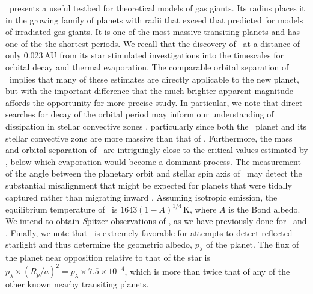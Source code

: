 \tresThree\ presents a useful testbed for theoretical models of gas giants.
Its radius places it in the growing family of planets with radii that exceed that predicted for models of irradiated gas giants.
It is one of the most massive transiting planets and has one of the the shortest periods.
We recall that the discovery of \ogletrFSb\ at a distance of only 0.023\,AU from its star stimulated investigations into the timescales for orbital decay and thermal evaporation.
The comparable orbital separation of \tresThree\ implies that many of these estimates are directly applicable to the new planet, but with the important difference that the much brighter apparent magnitude affords the opportunity for more precise study.
In particular, we note that direct searches for decay of the orbital period may inform our understanding of dissipation in stellar convective zones \citep{Sasselov:apj:2003a}, particularly since both the \tresThree\ planet and its stellar convective zone are more massive than that of \ogletrFSb.
Furthermore, the mass and orbital separation of \tresThree\ are intriguingly close to the critical values estimated by \citet{Baraffe_Selsis_Chabrier:aa:2004a}, below which evaporation would become a dominant process.
The measurement of the angle between the planetary orbit and stellar spin axis of \tresThree\ may detect the substantial misalignment that might be expected for planets that were tidally captured rather than migrating inward \citep{Gaudi_Winn:apj:2007a}.
Assuming isotropic emission, the equilibrium temperature of \tresThree\ is $1643(1-A)^{1/4}$\,K, where $A$ is the Bond albedo.
We intend to obtain {\textit Spitzer} observations of \tresThree, as we have previously done for \tresOne\ and \tresTwo.
Finally, we note that \tresThree\ is extremely favorable for attempts to detect reflected starlight \citep{Charbonneau_Noyes_Korzennik:apjl:1999a, Leigh_Collier-Cameron_Udry:mnras:2003a, Rowe_Matthews_Seager:apj:2006a} and thus determine the geometric albedo, $p_{\lambda}$ of the planet.
The flux of the planet near opposition relative to that of the star is $p_{\lambda} \times (R_p / a)^2 = p_{\lambda} \times 7.5 \times 10^{-4}$, which is more than twice that of any of the other known nearby transiting planets.
